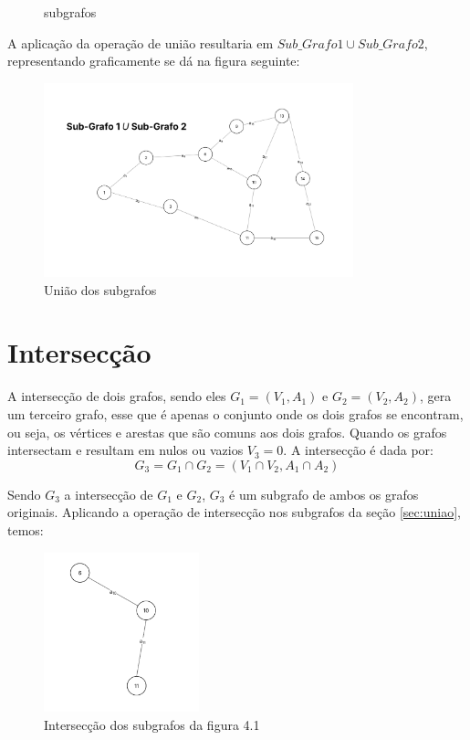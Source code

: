 \begin{figure}[!htb]
		\caption{subgrafos}
		\label{fig:duasFiguras}
	\end{figure}
	
	A aplicação da operação de união resultaria em $Sub\_Grafo1 \cup Sub\_Grafo2$, representando graficamente se dá na figura seguinte:
	
	\begin{figure}
		\centering
		\includegraphics[width=0.8\textwidth]{figuras/subgrafos/subgrafo1usubgrafo2.png}
		\caption{União dos subgrafos}
		\label{fig:uniaoGrafos}
	\end{figure}
	
	\section{Intersecção}\label{sec:interseccao}
	A intersecção de dois grafos, sendo eles $G_1 = (V_1, A_1)$ e $G_2 = (V_2, A_2)$, gera um terceiro grafo, esse que é apenas o conjunto onde os dois grafos se encontram, ou seja, os vértices e arestas que são comuns aos dois grafos. Quando os grafos intersectam e resultam em nulos ou vazios $V_3 = 0$. A intersecção é dada por:
	\[
	G_3 = G_1 \cap G_2 = (V_1 \cap V_2, A_1 \cap A_2)
	\]
	
	Sendo $G_3$ a intersecção de $G_1$ e $G_2$, $G_3$ é um subgrafo de ambos os grafos originais.
	Aplicando a operação de intersecção nos subgrafos da seção \ref{sec:uniao}, temos:
	
	\begin{figure}[!h]
		\centering
		\includegraphics[width=0.4\textwidth]{figuras/subgrafos/subgrafo_inter.png}
		\caption{Intersecção dos subgrafos da figura 4.1}
		\label{fig:intersecaoGrafos}
	\end{figure}
	
